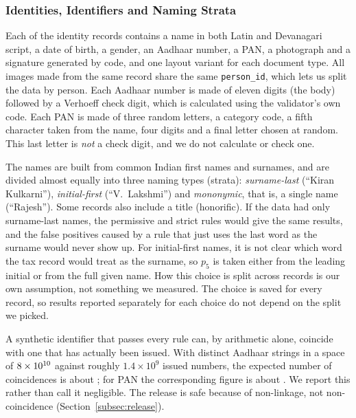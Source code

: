 \documentclass[12pt]{article}
\begin{document}

\subsubsection{Identities, Identifiers and Naming Strata}
\label{subsec:records}
\label{subsec:identifiers}

Each of the \dsPersons{} identity records contains a name in both Latin and Devanagari script, a date of birth, a gender, an Aadhaar number, a PAN, a photograph and a signature generated by code, and one layout variant for each document type. All images made from the same record share the same \texttt{person\_id}, which lets us split the data by person. Each Aadhaar number is made of eleven digits (the body) followed by a Verhoeff check digit, which is calculated using the validator's own code. Each PAN is made of three random letters, a category code, a fifth character taken from the name, four digits and a final letter chosen at random. This last letter is \emph{not} a check digit, and we do not calculate or check one.

The names are built from common Indian first names and surnames, and are divided almost equally into three naming types (strata): \emph{surname-last} (``Kiran Kulkarni''), \emph{initial-first} (``V.~Lakshmi'') and \emph{mononymic}, that is, a single name (``Rajesh''). Some records also include a title (honorific). If the data had only surname-last names, the permissive and strict rules would give the same results, and the false positives caused by a rule that just uses the last word as the surname would never show up. For initial-first names, it is not clear which word the tax record would treat as the surname, so $p_5$ is taken either from the leading initial or from the full given name. How this choice is split across records is our own assumption, not something we measured. The choice is saved for every record, so results reported separately for each choice do not depend on the split we picked.

A synthetic identifier that passes every rule can, by arithmetic alone,
coincide with one that has actually been issued. With \dsAadhaarStrings{}
distinct Aadhaar strings in a space of $8\times10^{10}$ against roughly
$1.4\times10^9$ issued numbers, the expected number of coincidences is
about \dsAadhaarCoinExp{}; for PAN the corresponding figure is about
\dsPanCoinExp{}. We report this rather than call it negligible. The
release is safe because of non-linkage, not non-coincidence
(Section~\ref{subsec:release}).
\end{document}
